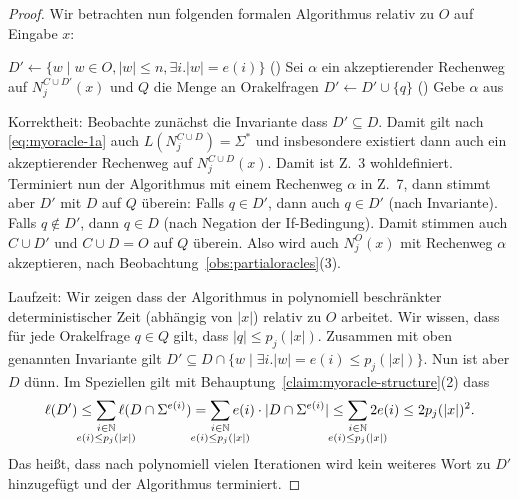 \begin{proof}
    Wir betrachten nun folgenden formalen Algorithmus relativ zu $O$ auf Eingabe $x$:\\
    \begin{algorithm}[H]
        $D'\gets \{ w\mid w\in O, |w|\leq n, \exists i.|w|=e(i)\}$ 
        \Loop(){}
        {
            Sei $\alpha$ ein akzeptierender Rechenweg auf $N_j^{C\cup D'}(x)$ und $Q$ die Menge an Orakelfragen\;
            {
                $D'\gets D' \cup \{q\}$\;
            }
            \Else(){
                Gebe {$\alpha$} aus\;
            }
        }
    \end{algorithm}

    Korrektheit: Beobachte zunächst die Invariante dass $D'\subseteq D$.
    Damit gilt nach \eqref{eq:myoracle-1a} auch $L(N_j^{C\cup D})=\Sigma^*$ und insbesondere existiert dann auch ein akzeptierender Rechenweg auf $N_j^{C\cup D}(x)$. Damit ist Z.~3 wohldefiniert.
    Terminiert nun der Algorithmus mit einem Rechenweg $\alpha$ in Z.~7, 
    dann stimmt aber $D'$ mit $D$ auf $Q$ überein: 
    Falls $q\in D'$, dann auch $q\in D'$ (nach Invariante).
    Falls $q\not\in D'$, dann $q\in D$ (nach Negation der If-Bedingung).
    Damit stimmen auch $C\cup D'$ und $C\cup D=O$ auf $Q$ überein.
    Also wird auch $N_j^O(x)$ mit Rechenweg $\alpha$ akzeptieren, nach Beobachtung~\ref{obs:partialoracles}(3).

    Laufzeit: Wir zeigen dass der Algorithmus in polynomiell beschränkter deterministischer Zeit (abhängig von $|x|$) relativ zu $O$ arbeitet. 
    Wir wissen, dass für jede Orakelfrage $q\in Q$ gilt, dass $|q|\leq p_j(|x|)$.
    Zusammen mit oben genannten Invariante gilt $D'\subseteq D\cap \{w \mid \exists i.|w|=e(i)\leq p_j(|x|)\}$.
    Nun ist aber $D$ dünn. Im Speziellen gilt mit Behauptung~\ref{claim:myoracle-structure}(2) dass
\[ \ell(D') \leq \sum_{\mathclap{\substack{i\in\mathbb N\\ e(i)\leq p_j(|x|)}}} \ell(D\cap\Sigma^{e(i)}) = \sum_{\mathclap{\substack{i\in\mathbb N\\ e(i)\leq p_j(|x|)}}} e(i)\cdot |D\cap\Sigma^{e(i)}| \leq \sum_{\mathclap{\substack{i\in\mathbb N\\ e(i)\leq p_j(|x|)}}} 2e(i) \leq 2p_j(|x|)^2. \]
    Das heißt, dass nach polynomiell vielen Iterationen wird kein weiteres Wort zu $D'$ hinzugefügt und der Algorithmus terminiert.


\end{proof}
